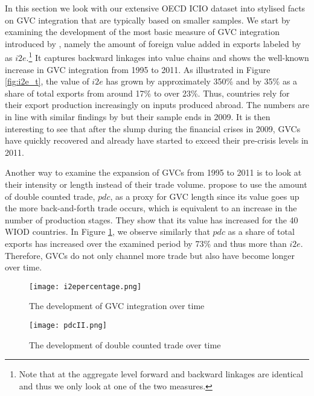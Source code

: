 \documentclass[11pt,a4paper]{article}
\begin{document}
In this section we look with our extensive OECD ICIO dataset into stylised facts on GVC integration that are typically based on smaller samples. We start by examining the development of the most basic measure of GVC integration introduced by \citet{dahuetal01}, namely the amount of foreign value added in exports labeled by \citet{ribajalo13} as $i2e$.\footnote{Note that at the aggregate level forward and backward linkages are identical and thus we only look at one of the two measures.} It captures backward linkages into value chains and shows the well-known increase in GVC integration from 1995 to 2011. As illustrated in Figure \ref{fig:i2e_t}, the value of $i2e$ has grown by approximately 350\% and by 35\% as a share of total exports from around 17\% to over 23\%. Thus, countries rely for their export production increasingly on inputs produced abroad. The numbers are in line with similar findings by \citet{rojoguno12b} but their sample ends in 2009. It is then interesting to see that after the slump during the financial crises in 2009, GVCs have quickly recovered and already have started to exceed their pre-crisis levels in 2011.


Another way to examine the expansion of GVCs from 1995 to 2011 is to look at their intensity or length instead of their trade volume. \citet{zhwaetal13} propose to use the amount of double counted trade, $pdc$, as a proxy for GVC length since its value goes up the more back-and-forth trade occurs, which is equivalent to an increase in the number of production stages. They show that its value has increased for the 40 WIOD countries. In Figure \ref{fig:pdc_t}, we observe similarly that $pdc$ as a share of total exports has increased over the examined period by 73\% and thus more than $i2e$. Therefore, GVCs do not only channel more trade but also have become longer over time.

\begin{figure}
\centering
\begin{minipage}{0.45\textwidth}
\vspace{0.8cm}
\centering
\texttt{[image: i2epercentage.png]}
\caption{The development of GVC integration over time}
\label{fig:i2e_t}
\end{minipage}\hfill
\begin{minipage}{0.45\textwidth}
\centering
\texttt{[image: pdcII.png]}
\caption{The development of double counted trade over time}
\label{fig:pdc_t}
\end{minipage}
\end{figure}
\end{document}
